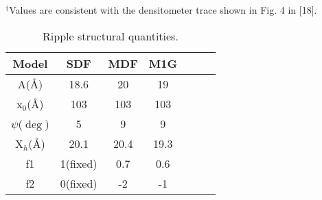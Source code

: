 \begin{table}
{\indent $^{\dag}$Values are consistent with the densitometer trace shown in 
	Fig. 4 in [18].
}
\end{table}

\pagebreak

\begin{table}
\caption{Ripple structural quantities.
\label{parameter}}
\vspace{6pt}
\begin{tabular}{ccccccc} 
Model & SDF & MDF & M1G \\ \hline
A(\AA) & 18.6 & 20  & 19 \\
x$_0$(\AA) & 103 & 103 & 103 \\
$\psi$($\deg$) & 5 & 9 & 9 \\
X$_h$(\AA) & 20.1 & 20.4 & 19.3 \\
f1 & 1(fixed) & 0.7 & 0.6 \\
f2 & 0(fixed) & -2 & -1 \\
\end{tabular}
\end{table}
